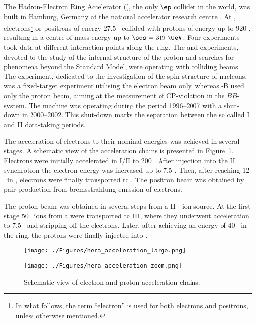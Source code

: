 The Hadron-Electron Ring Accelerator (\hera), the only $\ep$ collider in the world, was built in Hamburg, Germany at the national accelerator research centre \desy. At \hera, electrons\footnote{In what follows, the term ``electron'' is used for both electrons and positrons, unless otherwise mentioned.} or positrons of energy $27.5$ \GeV\, collided with protons of energy up to 920 \GeV, resulting in a centre-of-mass energy up to $\sqs = 319\; \GeV$. Four experiments took data at different interaction points along the \hera ring. The \zeus and \hone experiments, devoted to the study of the internal structure of the proton and searches for phenomena beyond the Standard Model, were operating with colliding beams. The \hermes experiment, dedicated to the investigation of the spin structure of nucleons, was a fixed-target experiment utilising the electron beam only, whereas \hera-B used only the proton beam, aiming at the measurement of CP-violation in the $B\bar{B}$-system. The \hera machine was operating during the period 1996--2007 with a shut-down in 2000--2002. This shut-down marks the separation between the so called \hera I and \hera II data-taking periods.

The acceleration of electrons to their nominal energies was achieved in several stages. A schematic view of the acceleration chains is presented in Figure~\ref{fig:hera_acceleration}. Electrons were initially accelerated in \linac I/II to 200 \MeV. After injection into the \desy II synchrotron the electron energy was increased up to 7.5 \GeV. Then, after reaching 12 \GeV\, in \petra, electrons were finally transported to \hera. The positron beam was obtained by pair production from bremsstrahlung emission of electrons. 

The proton beam was obtained in several steps from a $\text{H}^-$ ion source. At the first stage 50 \MeV\, ions from a \linac were transported to \desy III, where they underwent acceleration to 7.5 \GeV\, and stripping off the electrons. Later, after achieving an energy of 40 \GeV\, in the \petra ring, the protons were finally injected into \hera.

\begin{figure}[htpb]
	\centering
	\begin{subfloat}[]{\texttt{[image: ./Figures/hera\_acceleration\_large.png]}
			\label{fig:hera_acceleration_large}
	 }%
	\end{subfloat}
	\begin{subfloat}[]{\texttt{[image: ./Figures/hera\_acceleration\_zoom.png]}
			\label{fig:hera_acceleration_zoom}
	 }%
	\end{subfloat}
	\caption{Schematic view of electron and proton acceleration chains.}
\label{fig:hera_acceleration}
\end{figure}

